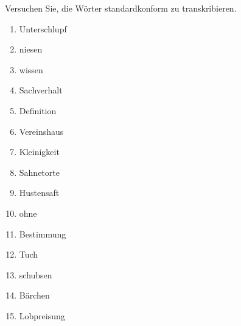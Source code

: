 \Uebung \label{u33} Versuchen Sie, die Wörter standardkonform zu transkribieren.

\begin{enumerate}\Lf
  \item Unterschlupf
  \item niesen
  \item wissen
  \item Sachverhalt
  \item Definition
  \item Vereinshaus
  \item Kleinigkeit
  \item Sahnetorte
  \item Hustensaft
  \item ohne
  \item Bestimmung
  \item Tuch
  \item schubsen
  \item Bärchen
  \item Lobpreisung
\end{enumerate}

